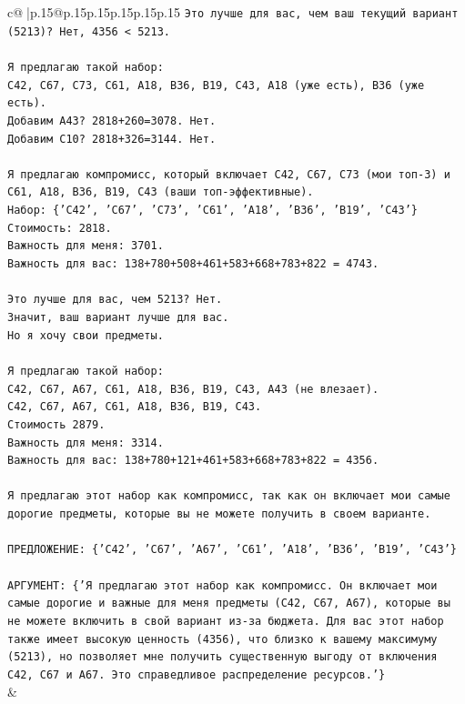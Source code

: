 \documentclass{article}
\begin{document}
{\begin{supertabular}{c@{$\;$}|p{.15\linewidth}@{}p{.15\linewidth}p{.15\linewidth}p{.15\linewidth}p{.15\linewidth}p{.15\linewidth}}
{{{\texttt{Это лучше для вас, чем ваш текущий вариант (5213)? Нет, 4356 < 5213.} \\
\\ 
\texttt{Я предлагаю такой набор:} \\
\texttt{C42, C67, C73, C61, A18, B36, B19, C43, A18 (уже есть), B36 (уже есть).} \\
\texttt{Добавим A43? 2818+260=3078. Нет.} \\
\texttt{Добавим C10? 2818+326=3144. Нет.} \\
\\ 
\texttt{Я предлагаю компромисс, который включает C42, C67, C73 (мои топ{-}3) и C61, A18, B36, B19, C43 (ваши топ{-}эффективные).} \\
\texttt{Набор: \{'C42', 'C67', 'C73', 'C61', 'A18', 'B36', 'B19', 'C43'\}} \\
\texttt{Стоимость: 2818.} \\
\texttt{Важность для меня: 3701.} \\
\texttt{Важность для вас: 138+780+508+461+583+668+783+822 = 4743.} \\
\\ 
\texttt{Это лучше для вас, чем 5213? Нет.} \\
\texttt{Значит, ваш вариант лучше для вас.} \\
\texttt{Но я хочу свои предметы.} \\
\\ 
\texttt{Я предлагаю такой набор:} \\
\texttt{C42, C67, A67, C61, A18, B36, B19, C43, A43 (не влезает).} \\
\texttt{C42, C67, A67, C61, A18, B36, B19, C43.} \\
\texttt{Стоимость 2879.} \\
\texttt{Важность для меня: 3314.} \\
\texttt{Важность для вас: 138+780+121+461+583+668+783+822 = 4356.} \\
\\ 
\texttt{Я предлагаю этот набор как компромисс, так как он включает мои самые дорогие предметы, которые вы не можете получить в своем варианте.} \\
\\ 
\texttt{ПРЕДЛОЖЕНИЕ: \{'C42', 'C67', 'A67', 'C61', 'A18', 'B36', 'B19', 'C43'\}} \\
\\ 
\texttt{АРГУМЕНТ: \{'Я предлагаю этот набор как компромисс. Он включает мои самые дорогие и важные для меня предметы (C42, C67, A67), которые вы не можете включить в свой вариант из{-}за бюджета. Для вас этот набор также имеет высокую ценность (4356), что близко к вашему максимуму (5213), но позволяет мне получить существенную выгоду от включения C42, C67 и A67. Это справедливое распределение ресурсов.'\}} \\
            }
        }
    }
    & \\ \\


\end{supertabular}}
\end{document}
